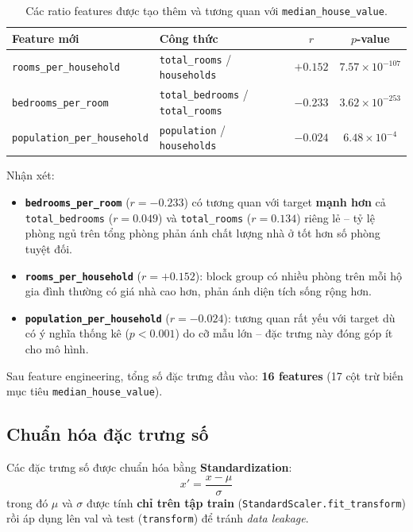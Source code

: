 \documentclass[12pt, a4paper]{article}
\begin{document}
\begin{table}[H]
  \centering
  \caption{Các ratio features được tạo thêm và tương quan với
           \texttt{median\_house\_value}.}
  \label{tab:ratio_features}
  \begin{tabular}{llcc}
    \toprule
    \textbf{Feature mới} & \textbf{Công thức} & $r$ & $p$-value \\
    \midrule
    \texttt{rooms\_per\_household}
      & \texttt{total\_rooms} / \texttt{households}
      & $+0.152$ & $7.57 \times 10^{-107}$ \\
    \texttt{bedrooms\_per\_room}
      & \texttt{total\_bedrooms} / \texttt{total\_rooms}
      & $-0.233$ & $3.62 \times 10^{-253}$ \\
    \texttt{population\_per\_household}
      & \texttt{population} / \texttt{households}
      & $-0.024$ & $6.48 \times 10^{-4}$ \\
    \bottomrule
  \end{tabular}
\end{table}

Nhận xét:
\begin{itemize}
  \item \textbf{\texttt{bedrooms\_per\_room}} ($r = -0.233$) có tương
        quan với target \textbf{mạnh hơn} cả \texttt{total\_bedrooms}
        ($r = 0.049$) và \texttt{total\_rooms} ($r = 0.134$) riêng lẻ --
        tỷ lệ phòng ngủ trên tổng phòng phản ánh chất lượng nhà ở tốt hơn
        số phòng tuyệt đối.
  \item \textbf{\texttt{rooms\_per\_household}} ($r = +0.152$): block
        group có nhiều phòng trên mỗi hộ gia đình thường có giá nhà cao hơn,
        phản ánh diện tích sống rộng hơn.
  \item \textbf{\texttt{population\_per\_household}} ($r = -0.024$):
        tương quan rất yếu với target dù có ý nghĩa thống kê ($p < 0.001$)
        do cỡ mẫu lớn -- đặc trưng này đóng góp ít cho mô hình.
\end{itemize}

Sau feature engineering, tổng số đặc trưng đầu vào:
\textbf{16 features} (17 cột trừ biến mục tiêu
\texttt{median\_house\_value}).

\subsection{Chuẩn hóa đặc trưng số}

Các đặc trưng số được chuẩn hóa bằng \textbf{Standardization}:
$$x' = \frac{x - \mu}{\sigma}$$
trong đó $\mu$ và $\sigma$ được tính \textbf{chỉ trên tập train}
(\texttt{StandardScaler.fit\_transform}) rồi áp dụng lên val và test
(\texttt{transform}) để tránh \emph{data leakage}.
\end{document}
